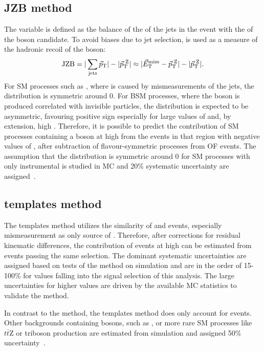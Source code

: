 \subsection{JZB method}
The \JZB variable is defined as the balance of the \pt of the jets in the event with the \pt of the \Z boson candidate. To avoid biases due to jet selection, \METVec is used as a measure of the hadronic recoil of the \Z boson:
\begin{equation}
\textrm{JZB} = | \sum\limits_{\mathrm{jets}}\vec{p}_{\mathrm{T}}| - | \vec{p}_{\mathrm{T}}^{\text{ }\mathrm{Z}}| \approx | \vec{E}_{\mathrm{T}}^{\mathrm{miss}} -  \vec{p}_{\mathrm{T}}^{\text{ }\mathrm{ Z}}| - |\vec{p}_{\mathrm{T}}^{\text{ }\mathrm{Z}}| .
\end{equation}
For SM processes such as \zjets, where \MET is caused by mismeasurements of the jets, the \JZB distribution is symmetric around 0. For BSM processes, where the \Z boson is produced correlated with invisible particles, the \JZB distribution is expected to be asymmetric, favouring positive sign especially for large values of \JZB and, by extension, high \MET. Therefore, it is possible to predict the contribution of SM processes containing a \Z boson at high \MET from the events in that region with negative values of \JZB, after subtraction of flavour-symmetric processes from OF events. The assumption that the \JZB distribution is symmetric around 0 for SM processes with only instrumental \MET is studied in MC and 20\% systematic uncertainty are assigned~\cite{Khachatryan:2015lwa}.
\subsection{\MET templates method}
The \MET templates method utilizes the similarity of \zjets and \gjets events, especially mismeasurement as only source of \MET. Therefore, after corrections for residual kinematic differences, the contribution of \zjets events at high \MET can be estimated from \gjets events passing the same selection. The dominant systematic uncertainties are assigned based on tests of the method on simulation and are in the order of 15-100\% for \MET values falling into the signal selection of this analysis. The large uncertainties for higher \MET values are driven by the available MC statistics to validate the method. 

In contrast to the \JZB method, the \MET templates method does only account for \zjets events. Other backgrounds containing \Z bosons, such as \WZ, \ZZ or more rare SM processes like $t\bar{t}\mathrm{Z}$ or triboson production are estimated from simulation and assigned 50\% uncertainty~\cite{Khachatryan:2015lwa}. 
